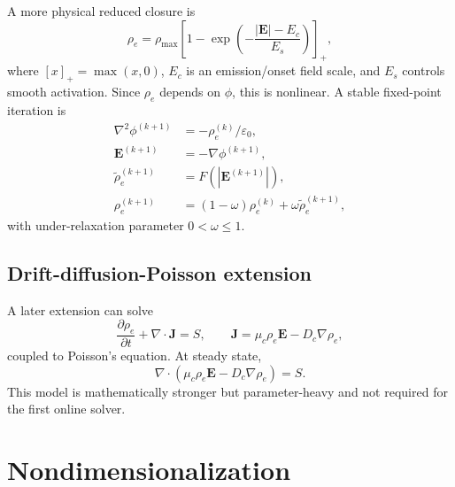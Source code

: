\documentclass[11pt]{article}
\newcommand{\eps}{\varepsilon}
\newcommand{\vE}{\mathbf{E}}
\newcommand{\vJ}{\mathbf{J}}
\newcommand{\grad}{\nabla}
\newcommand{\divg}{\nabla\!\cdot}
\newcommand{\abs}[1]{\left|#1\right|}
\begin{document}
A more physical reduced closure is
\begin{equation}
    \rho_e = \rho_{\max}\left[1-\exp\left(-\frac{\abs{\vE}-E_c}{E_s}\right)\right]_+,
    \label{eq:threshold_rho}
\end{equation}
where \([x]_+=\max(x,0)\), \(E_c\) is an emission/onset field scale, and \(E_s\) controls smooth activation. Since \(\rho_e\) depends on \(\phi\), this is nonlinear. A stable fixed-point iteration is
\begin{align}
    \nabla^2\phi^{(k+1)}&=-\rho_e^{(k)}/\eps_0,\\
    \vE^{(k+1)}&=-\grad\phi^{(k+1)},\\
    \widetilde{\rho}_e^{(k+1)}&=F(\abs{\vE^{(k+1)}}),\\
    \rho_e^{(k+1)}&=(1-\omega)\rho_e^{(k)}+\omega\widetilde{\rho}_e^{(k+1)},
\end{align}
with under-relaxation parameter \(0<\omega\le 1\).

\subsection{Drift-diffusion-Poisson extension}

A later extension can solve
\begin{equation}
    \frac{\partial\rho_e}{\partial t}+\divg\vJ=S,
    \qquad
    \vJ=\mu_c\rho_e\vE-D_c\grad\rho_e,
\end{equation}
coupled to Poisson's equation. At steady state,
\begin{equation}
    \divg(\mu_c\rho_e\vE-D_c\grad\rho_e)=S.
\end{equation}
This model is mathematically stronger but parameter-heavy and not required for the first online solver.

\section{Nondimensionalization}
\end{document}
